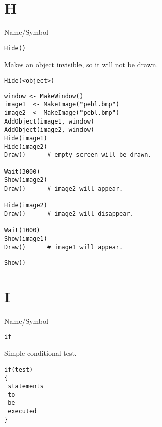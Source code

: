 \rl

\section{H}
\rl



\begin{desc}{Name/Symbol}
\item[Name/Symbol]	\verb+Hide()+ 

\item[Description]	Makes an object invisible, so it will not be drawn.

\item[Usage]
\begin{verbatim}
Hide(<object>)
\end{verbatim}

\item[Example]
\begin{verbatim}
window <- MakeWindow()
image1  <- MakeImage("pebl.bmp")
image2  <- MakeImage("pebl.bmp")
AddObject(image1, window)
AddObject(image2, window)
Hide(image1)
Hide(image2)
Draw()		# empty screen will be drawn.
	
Wait(3000)
Show(image2)
Draw()		# image2 will appear.

Hide(image2)
Draw()		# image2 will disappear.

Wait(1000)
Show(image1)
Draw()		# image1 will appear.
\end{verbatim}
 
\item[See Also]	\verb+Show()+
\end{desc}

\rl


\section{I}
\rl


\begin{desc}{Name/Symbol}
\item[Name/Symbol]	\verb+if+ 

\item[Description]	Simple conditional test.

\item[Usage]
\begin{verbatim}
if(test)
{
 statements
 to
 be 
 executed
}
\end{verbatim}

\item[Example]	

\item[See Also]	
\end{desc}

